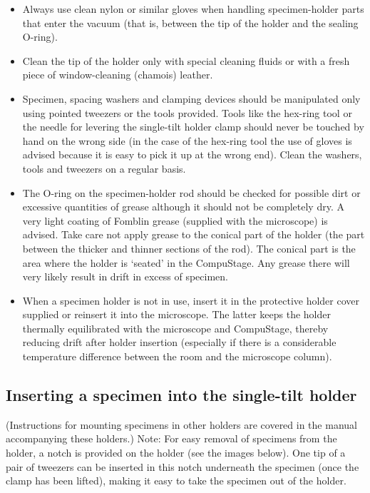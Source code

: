 \documentclass[12pt]{article}
\begin{document}
\begin{itemize}
\item  Always use clean nylon or similar gloves when handling
specimen-holder parts that enter the vacuum (that is, between the tip
of the holder and the sealing O-ring).

\item  Clean the tip of the holder only with special cleaning fluids or
with a fresh piece of window-cleaning (chamois) leather.

\item  Specimen, spacing washers and clamping devices should be
manipulated only using pointed tweezers or the tools provided. Tools
like the hex-ring tool or the needle for levering the single-tilt
holder clamp should never be touched by hand on the wrong side (in
the case of the hex-ring tool the use of gloves is advised because it
is easy to pick it up at the wrong end). Clean the washers, tools
and tweezers on a regular basis.

\item  The O-ring on the specimen-holder rod should be checked for
possible dirt or excessive quantities of grease although it should not
be completely dry. A very light coating of Fomblin grease (supplied with
the microscope) is advised. Take care not apply grease to the conical
part of the holder (the part between the thicker and thinner sections
of the rod). The conical part is the area where the holder is
`seated' in the CompuStage. Any grease there will very likely result
in drift in excess of specimen.

\item  When a specimen holder is not in use, insert it in the protective
holder cover supplied or reinsert it into the microscope. The latter
keeps the holder thermally equilibrated with the microscope and
CompuStage, thereby reducing drift after holder insertion (especially
if there is a considerable
temperature difference between the room and the microscope column).
\end{itemize}

\subsection{Inserting a specimen into the single-tilt holder}

(Instructions for mounting specimens in other holders are covered in
the manual accompanying these holders.)
Note: For easy removal of specimens from the holder, a notch is provided
on the holder (see the images below). One tip of a pair of tweezers
can be inserted in this notch underneath the specimen (once the clamp
has been lifted), making it easy to take the specimen out of the holder.
\end{document}
